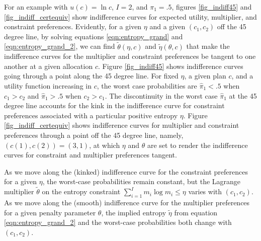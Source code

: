  For an example with $u(c) = \ln c$,  $I=2$, and $\pi_1 = .5$, figures \ref{fig_indiff45} %
and \ref{fig_indiff_certequiv} show indifference curves for expected utility,
multiplier, and constraint preferences.  %
Evidently,   for a given $\eta$ and a given $(c_1, c_2)$  off the 45 degree %
line, by solving
 equations \eqref{eqn:entropy_grand} and \eqref{eqn:entropy_grand_2},  we can find  $\tilde \theta (\eta, c)$
 and  $\tilde \eta(\theta,c)$ that make the indifference
curves for the multiplier and constraint preferences be tangent to one another at a given allocation $c$.
Figure \ref{fig_indiff45} shows indifference curves going through a point along the 45 degree line. For fixed $\eta$, a given
 plan $c$, and a utility function
 increasing in $c$, the worst
case probabilities   are $\hat \pi_1 < .5$ when $c_1 > c_2$ and $\hat \pi_1 > .5 $ when $c_2 > c_1$.  The discontinuity in the worst case
$\hat \pi_1$ at the 45 degree line  accounts
for the kink  in the indifference curve for constraint preferences associated with  a particular
positive entropy  $\eta$.
Figure %
 \ref{fig_indiff_certequiv} shows
 indifference curves for multiplier and constraint preferences through a point off the 45 degree line, namely, $(c(1),c(2)) = (3,1)$, %
   at which $\eta$ and $\theta $ are set to render the indifference curves for constraint and multiplier preferences tangent.


\begin{remark}
As we move along  the (kinked) indifference curve for the constraint preferences for a given $\eta$, the worst-case probabilities
remain constant, but the Lagrange  multiplier $\tilde \theta$ on the
entropy constraint $ \sum_{i=1}^I m_i \log m_i \leq \eta $
varies with $(c_1, c_2)$.  As we move along the (smooth) indifference curve for the multiplier preferences for a given penalty parameter
$\theta$,  the implied
entropy $\tilde \eta$ from equation \eqref{eqn:entropy_grand_2} and the worst-case probabilities both change with $(c_1, c_2)$.\end{remark}

